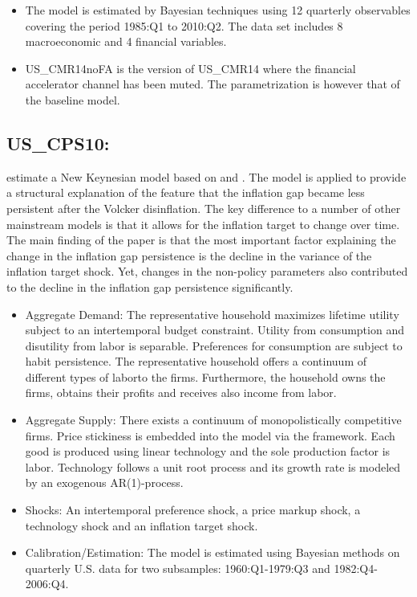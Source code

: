 \documentclass[11pt,a4paper]{article}
\begin{document}
\begin{itemize}
		\item The model is estimated by Bayesian techniques using 12 quarterly observables covering the period 1985:Q1 to 2010:Q2. The data set includes 8 macroeconomic and 4  financial variables. 
		\item US\_CMR14noFA is the version of US\_CMR14 where the financial accelerator channel has been muted. The parametrization is however that of the baseline model.      
	\end{itemize}
	
	
	\subsection{US\_CPS10: \cite{Cogleyetal2010}}	
	\label{USCPS10} 
	\cite{Cogleyetal2010} estimate a New Keynesian model based on \cite{RotembergWoodford1997} and \cite{boivin2006has}. The model is applied to provide a structural explanation of the feature that the inflation gap became less persistent after the Volcker disinflation. The key difference to a number of other mainstream models is that it allows for the inflation target to change over time. The main finding of the paper is that the most important factor explaining the change in the inflation gap persistence is the decline in the variance of the inflation target shock. Yet, changes in the non-policy parameters also contributed to the decline in the inflation gap persistence significantly.
	\begin{itemize}
		\item Aggregate Demand: The representative household maximizes lifetime utility subject to an intertemporal budget constraint. Utility from consumption and disutility from labor is separable. Preferences for consumption are subject to habit persistence. The representative household offers a continuum of different types of laborto the firms. Furthermore, the household owns the firms, obtains their profits and receives also income from labor.
		\item Aggregate Supply: There exists a continuum of monopolistically competitive firms. Price stickiness is embedded into the model via the \cite{Calvo1983} framework. Each good is produced using linear technology and the sole production factor is labor. Technology follows a unit root process and its growth rate is modeled by an exogenous AR(1)-process.
		\item Shocks: An intertemporal preference shock, a price markup shock, a technology shock and an inflation target shock.
		\item Calibration/Estimation: The model is estimated using Bayesian methods on quarterly U.S. data for two subsamples: 1960:Q1-1979:Q3 and 1982:Q4-2006:Q4.
	\end{itemize}
	
\end{document}
